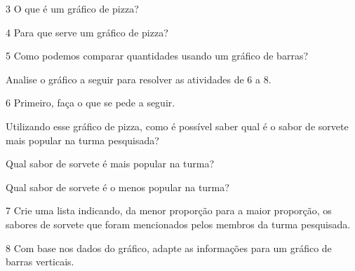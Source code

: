\num{3} O que é um gráfico de pizza?


\num{4} Para que serve um gráfico de pizza?



\num{5} Como podemos comparar quantidades usando um gráfico de barras?



Analise o gráfico a seguir para resolver as atividades de 6 a 8.

\begin{figure}[htpb!]
\end{figure}

\num{6} Primeiro, faça o que se pede a seguir.

\begin{escolha}
\item Utilizando esse gráfico de pizza, como é possível saber qual é o sabor de sorvete mais popular na turma pesquisada?



\item Qual sabor de sorvete é mais popular na turma?



\item Qual sabor de sorvete é o menos popular na turma?

\end{escolha}

\num{7} Crie uma lista indicando, da menor proporção para a maior proporção, os sabores de sorvete que foram mencionados pelos membros da turma pesquisada.



\num{8} Com base nos dados do gráfico, adapte as informações para um gráfico de barras verticais.

